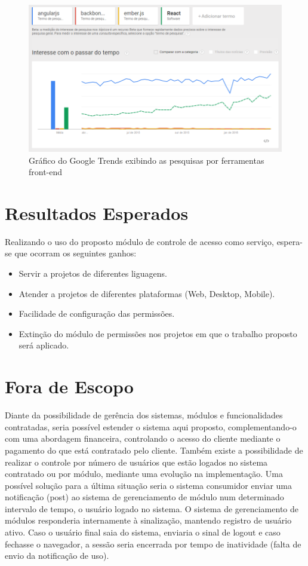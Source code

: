\begin{figure} %
	\label{fig:graficoGoogleTrendsFerramentasFront}
	\includegraphics[width=1\textwidth]{img/grafico_ferramentas_front}
	\caption{Gráfico do Google Trends exibindo as pesquisas por ferramentas front-end}
\end{figure}


\section{Resultados Esperados}


Realizando o uso do proposto módulo de controle de acesso como serviço, espera-se que ocorram os seguintes ganhos:


\begin{itemize}
	\item Servir a projetos de diferentes liguagens.
	\item Atender a projetos de diferentes plataformas (Web, Desktop, Mobile).
	\item Facilidade de configuração das permissões.
	\item Extinção do módulo de permissões nos projetos em que o trabalho proposto será aplicado.
\end{itemize}


\section{Fora de Escopo}


Diante da possibilidade de gerência dos sistemas, módulos e funcionalidades contratadas, seria possível estender o sistema aqui proposto, complementando-o com uma abordagem financeira, controlando o acesso do cliente mediante o pagamento do que está contratado pelo cliente. Também existe a possibilidade de realizar o controle por número de usuários que estão logados no sistema contratado ou por módulo, mediante uma evolução na implementação. Uma possível solução para a última situação seria o sistema consumidor enviar uma notificação (post) ao sistema de gerenciamento de módulo num determinado intervalo de tempo, o usuário logado no sistema. O sistema de gerenciamento de módulos responderia internamente à sinalização, mantendo registro de usuário ativo. Caso o usuário final saia do sistema, enviaria o sinal de logout e caso fechasse o navegador, a sessão seria encerrada por tempo de inatividade (falta de envio da notificação de uso).



